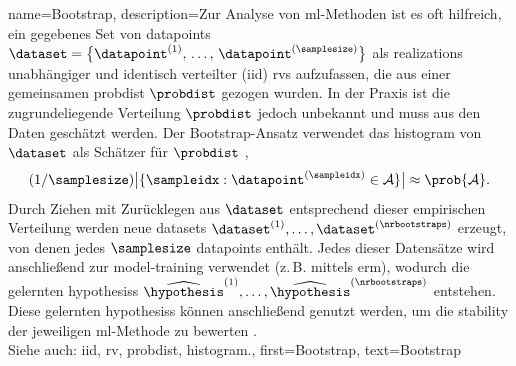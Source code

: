 {{{{
{name={Bootstrap},
	description={Zur Analyse von \gls{ml}-Methoden ist es oft hilfreich, 
	ein gegebenes Set von \glspl{datapoint} 
	$\dataset = \big\{ \datapoint^{(1)}, \,\ldots, \,\datapoint^{(\samplesize)}\big\}$ 
	als \glspl{realization} unabhängiger und identisch verteilter (\gls{iid}) \glspl{rv} 
	aufzufassen, die aus einer gemeinsamen \gls{probdist} $\probdist$ gezogen wurden. 
	In der Praxis ist die zugrundeliegende Verteilung $\probdist$ jedoch unbekannt und 
	muss aus den Daten geschätzt werden. Der Bootstrap-Ansatz verwendet das 
	\gls{histogram} von $\dataset$ als Schätzer für $\probdist$ 
	\cite{hastie01statisticallearning}, 
	$$ (1/\samplesize) \big| \{ \sampleidx : \datapoint^{(\sampleidx)} \in \mathcal{A} \} \big| 
	\approx \prob{\mathcal{A}}.$$
	Durch Ziehen mit Zurücklegen aus $\dataset$ entsprechend dieser empirischen Verteilung 
	werden neue \glspl{dataset} 
	$\dataset^{(1)}, \ldots, \dataset^{(\nrbootstraps)}$ erzeugt, 
	von denen jedes $\samplesize$ \glspl{datapoint} enthält. 
	Jedes dieser Datensätze wird anschließend zur \gls{model}-\gls{training} 
	verwendet (z.\,B. mittels \gls{erm}), 
	wodurch die gelernten \glspl{hypothesis} 
	$\widehat{\hypothesis}^{(1)}, \ldots, \widehat{\hypothesis}^{(\nrbootstraps)}$ entstehen. 
	Diese gelernten \glspl{hypothesis} können anschließend genutzt werden, 
	um die \gls{stability} der jeweiligen \gls{ml}-Methode zu bewerten 
	\cite{hastie01statisticallearning}.
	\\
	Siehe auch: \gls{iid}, \gls{rv}, \gls{probdist}, \gls{histogram}.},
	first={Bootstrap},
	text={Bootstrap}  
}

}}}}

